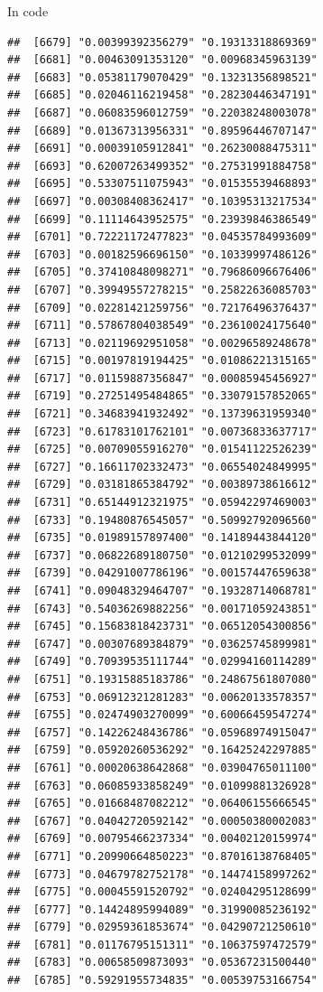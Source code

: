 \documentclass[ignorenonframetext,]{beamer}
\begin{document}
\begin{frame}[fragile]{In code}
\begin{verbatim}
##  [6679] "0.00399392356279" "0.19313318869369"
##  [6681] "0.00463091353120" "0.00968345963139"
##  [6683] "0.05381179070429" "0.13231356898521"
##  [6685] "0.02046116219458" "0.28230446347191"
##  [6687] "0.06083596012759" "0.22038248003078"
##  [6689] "0.01367313956331" "0.89596446707147"
##  [6691] "0.00039105912841" "0.26230088475311"
##  [6693] "0.62007263499352" "0.27531991884758"
##  [6695] "0.53307511075943" "0.01535539468893"
##  [6697] "0.00308408362417" "0.10395313217534"
##  [6699] "0.11114643952575" "0.23939846386549"
##  [6701] "0.72221172477823" "0.04535784993609"
##  [6703] "0.00182596696150" "0.10339997486126"
##  [6705] "0.37410848098271" "0.79686096676406"
##  [6707] "0.39949557278215" "0.25822636085703"
##  [6709] "0.02281421259756" "0.72176496376437"
##  [6711] "0.57867804038549" "0.23610024175640"
##  [6713] "0.02119692951058" "0.00296589248678"
##  [6715] "0.00197819194425" "0.01086221315165"
##  [6717] "0.01159887356847" "0.00085945456927"
##  [6719] "0.27251495484865" "0.33079157852065"
##  [6721] "0.34683941932492" "0.13739631959340"
##  [6723] "0.61783101762101" "0.00736833637717"
##  [6725] "0.00709055916270" "0.01541122526239"
##  [6727] "0.16611702332473" "0.06554024849995"
##  [6729] "0.03181865384792" "0.00389738616612"
##  [6731] "0.65144912321975" "0.05942297469003"
##  [6733] "0.19480876545057" "0.50992792096560"
##  [6735] "0.01989157897400" "0.14189443844120"
##  [6737] "0.06822689180750" "0.01210299532099"
##  [6739] "0.04291007786196" "0.00157447659638"
##  [6741] "0.09048329464707" "0.19328714068781"
##  [6743] "0.54036269882256" "0.00171059243851"
##  [6745] "0.15683818423731" "0.06512054300856"
##  [6747] "0.00307689384879" "0.03625745899981"
##  [6749] "0.70939535111744" "0.02994160114289"
##  [6751] "0.19315885183786" "0.24867561807080"
##  [6753] "0.06912321281283" "0.00620133578357"
##  [6755] "0.02474903270099" "0.60066459547274"
##  [6757] "0.14226248436786" "0.05968974915047"
##  [6759] "0.05920260536292" "0.16425242297885"
##  [6761] "0.00020638642868" "0.03904765011100"
##  [6763] "0.06085933858249" "0.01099881326928"
##  [6765] "0.01668487082212" "0.06406155666545"
##  [6767] "0.04042720592142" "0.00050380002083"
##  [6769] "0.00795466237334" "0.00402120159974"
##  [6771] "0.20990664850223" "0.87016138768405"
##  [6773] "0.04679782752178" "0.14474158997262"
##  [6775] "0.00045591520792" "0.02404295128699"
##  [6777] "0.14424895994089" "0.31990085236192"
##  [6779] "0.02959361853674" "0.04290721250610"
##  [6781] "0.01176795151311" "0.10637597472579"
##  [6783] "0.00658509873093" "0.05367231500440"
##  [6785] "0.59291955734835" "0.00539753166754"

\end{verbatim}
\end{frame}
\end{document}
